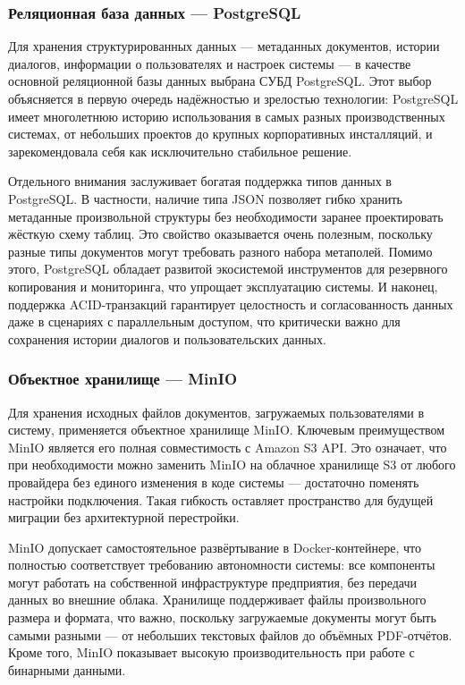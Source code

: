 \subsubsection{Реляционная база данных — PostgreSQL}

Для хранения структурированных данных — метаданных документов, истории диалогов, информации о пользователях и настроек системы — в качестве основной реляционной базы данных выбрана СУБД PostgreSQL. Этот выбор объясняется в первую очередь надёжностью и зрелостью технологии: PostgreSQL имеет многолетнюю историю использования в самых разных производственных системах, от небольших проектов до крупных корпоративных инсталляций, и зарекомендовала себя как исключительно стабильное решение.

Отдельного внимания заслуживает богатая поддержка типов данных в PostgreSQL. В частности, наличие типа JSON позволяет гибко хранить метаданные произвольной структуры без необходимости заранее проектировать жёсткую схему таблиц. Это свойство оказывается очень полезным, поскольку разные типы документов могут требовать разного набора метаполей. Помимо этого, PostgreSQL обладает развитой экосистемой инструментов для резервного копирования и мониторинга, что упрощает эксплуатацию системы. И наконец, поддержка ACID-транзакций гарантирует целостность и согласованность данных даже в сценариях с параллельным доступом, что критически важно для сохранения истории диалогов и пользовательских данных.

\subsubsection{Объектное хранилище — MinIO}

Для хранения исходных файлов документов, загружаемых пользователями в систему, применяется объектное хранилище MinIO. Ключевым преимуществом MinIO является его полная совместимость с Amazon S3 API. Это означает, что при необходимости можно заменить MinIO на облачное хранилище S3 от любого провайдера без единого изменения в коде системы — достаточно поменять настройки подключения. Такая гибкость оставляет пространство для будущей миграции без архитектурной перестройки.

MinIO допускает самостоятельное развёртывание в Docker-контейнере, что полностью соответствует требованию автономности системы: все компоненты могут работать на собственной инфраструктуре предприятия, без передачи данных во внешние облака. Хранилище поддерживает файлы произвольного размера и формата, что важно, поскольку загружаемые документы могут быть самыми разными — от небольших текстовых файлов до объёмных PDF-отчётов. Кроме того, MinIO показывает высокую производительность при работе с бинарными данными.

